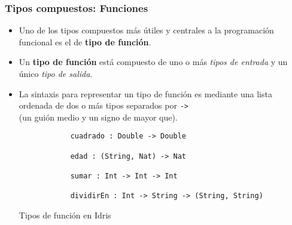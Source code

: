 \documentclass{beamer}
\begin{document}
\begin{frame}[fragile]
  \frametitle{Tipos compuestos: Funciones}

  \begin{itemize}
    \item Uno de los tipos compuestos más útiles y centrales a la programación
      funcional es el de \textbf{tipo de función}.
    \item Un \textbf{tipo de función} está compuesto de uno o más
      \emph{tipos de entrada} y un único \emph{tipo de salida}.
    \item La sintaxis para representar un tipo de función es mediante una lista ordenada
      de dos o más tipos separados por \texttt{->}
      \\\scriptsize(un guión medio y un signo de mayor que).

    \begin{listing}[H]
      \begin{center}
        \begin{minipage}{0.6\textwidth}
            \begin{verbatim}
            cuadrado : Double -> Double

            edad : (String, Nat) -> Nat

            sumar : Int -> Int -> Int

            dividirEn : Int -> String -> (String, String)
            \end{verbatim}
        \end{minipage}
      \end{center}
      \caption{Tipos de función en Idris}
      \label{lst:funidris}
    \end{listing}
  \end{itemize}

\end{frame}
\end{document}
